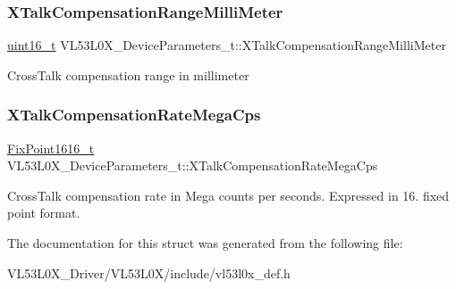 \subsubsection{\texorpdfstring{X\+Talk\+Compensation\+Range\+Milli\+Meter}{XTalkCompensationRangeMilliMeter}}
{\footnotesize\ttfamily \hyperlink{vl53l0x__types_8h_a273cf69d639a59973b6019625df33e30}{uint16\+\_\+t} V\+L53\+L0\+X\+\_\+\+Device\+Parameters\+\_\+t\+::\+X\+Talk\+Compensation\+Range\+Milli\+Meter}

Cross\+Talk compensation range in millimeter \mbox{\label{structVL53L0X__DeviceParameters__t_a60744d01901d1ff8ffe1145b33f86815}} 
\subsubsection{\texorpdfstring{X\+Talk\+Compensation\+Rate\+Mega\+Cps}{XTalkCompensationRateMegaCps}}
{\footnotesize\ttfamily \hyperlink{vl53l0x__types_8h_afb910790161809fc76e1a274a6349384}{Fix\+Point1616\+\_\+t} V\+L53\+L0\+X\+\_\+\+Device\+Parameters\+\_\+t\+::\+X\+Talk\+Compensation\+Rate\+Mega\+Cps}

Cross\+Talk compensation rate in Mega counts per seconds. Expressed in 16. fixed point format. 

The documentation for this struct was generated from the following file\+:\begin{DoxyCompactItemize}
\item 
V\+L53\+L0\+X\+\_\+\+Driver/\+V\+L53\+L0\+X/include/vl53l0x\+\_\+def.\+h\end{DoxyCompactItemize}
